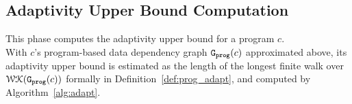 \subsection{Adaptivity Upper Bound Computation}
\label{sec:alg_adaptcompute}
This phase computes the adaptivity upper bound for a program $c$.
\\
With
$c$'s program-based data dependency graph $\mathtt{{G_{prog}}}({c})$ approximated above,
%
its adaptivity upper bound 
%
is estimated as
the length of the longest finite walk over $\mathcal{WK}(\mathtt{{G_{prog}}}({c}))$ formally in Definition~\ref{def:prog_adapt}, 
and computed 
by Algorithm~\ref{alg:adapt}.
%

